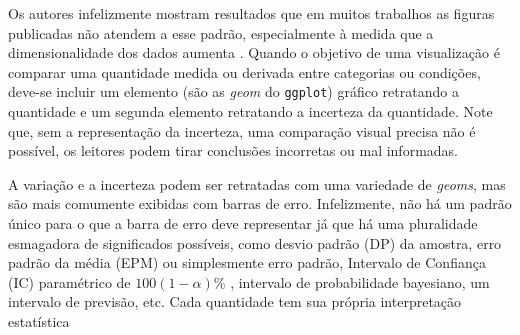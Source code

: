 \documentclass[article]{memoir}
\begin{document}
Os autores infelizmente mostram resultados que em muitos trabalhos as figuras publicadas não atendem a esse padrão, especialmente à medida que a dimensionalidade dos dados aumenta \cite{allen2012data}. Quando o objetivo de uma visualização é comparar uma quantidade medida ou derivada entre categorias ou condições, deve-se incluir um elemento (são as \textit{geom} do \texttt{ggplot}) gráfico retratando a quantidade e um segunda elemento  retratando a incerteza da quantidade. Note que, sem a representação da incerteza, uma comparação visual precisa não é possível, os leitores podem tirar conclusões incorretas ou mal informadas.

A variação e a incerteza podem ser retratadas com uma variedade de \textit{geoms}, mas são mais comumente exibidas com barras de erro. Infelizmente, não há um padrão único para o que a barra de erro deve representar já que há uma pluralidade esmagadora de significados possíveis, como desvio padrão (DP) da amostra, erro padrão da média (EPM) ou simplesmente erro padrão, Intervalo de Confiança (IC) paramétrico de $100(1 − \alpha)\%$ , intervalo de probabilidade bayesiano, um intervalo de previsão, etc. Cada quantidade tem sua própria interpretação estatística
\end{document}

